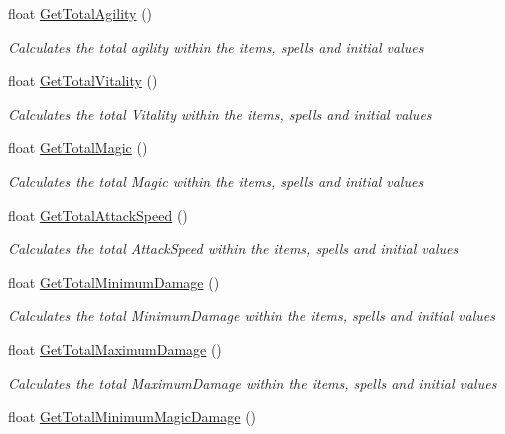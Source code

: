 \begin{DoxyCompactItemize}
float \hyperlink{class_hel_project_1_1_features_1_1_feature_manager_ac90f3988658e1b3976e75e430bb6e4c5}{Get\+Total\+Agility} ()
\begin{DoxyCompactList}\small\item\em Calculates the total agility within the items, spells and initial values \end{DoxyCompactList}\item 
float \hyperlink{class_hel_project_1_1_features_1_1_feature_manager_adcdbe81d240dd214000ca6a1bc46f9b1}{Get\+Total\+Vitality} ()
\begin{DoxyCompactList}\small\item\em Calculates the total Vitality within the items, spells and initial values \end{DoxyCompactList}\item 
float \hyperlink{class_hel_project_1_1_features_1_1_feature_manager_a8795128921c9d40161ea2cc54f0cd558}{Get\+Total\+Magic} ()
\begin{DoxyCompactList}\small\item\em Calculates the total Magic within the items, spells and initial values \end{DoxyCompactList}\item 
float \hyperlink{class_hel_project_1_1_features_1_1_feature_manager_a180a0742fc037b731348d82b960bd007}{Get\+Total\+Attack\+Speed} ()
\begin{DoxyCompactList}\small\item\em Calculates the total Attack\+Speed within the items, spells and initial values \end{DoxyCompactList}\item 
float \hyperlink{class_hel_project_1_1_features_1_1_feature_manager_a70cd5fd60ddb0d35810f4e8f55fdeadc}{Get\+Total\+Minimum\+Damage} ()
\begin{DoxyCompactList}\small\item\em Calculates the total Minimum\+Damage within the items, spells and initial values \end{DoxyCompactList}\item 
float \hyperlink{class_hel_project_1_1_features_1_1_feature_manager_aa2a965173213b11c08f3b25f5c920ccb}{Get\+Total\+Maximum\+Damage} ()
\begin{DoxyCompactList}\small\item\em Calculates the total Maximum\+Damage within the items, spells and initial values \end{DoxyCompactList}\item 
float \hyperlink{class_hel_project_1_1_features_1_1_feature_manager_aca527aecc8a8ea7370bc279e3237279b}{Get\+Total\+Minimum\+Magic\+Damage} ()

\end{DoxyCompactItemize}
